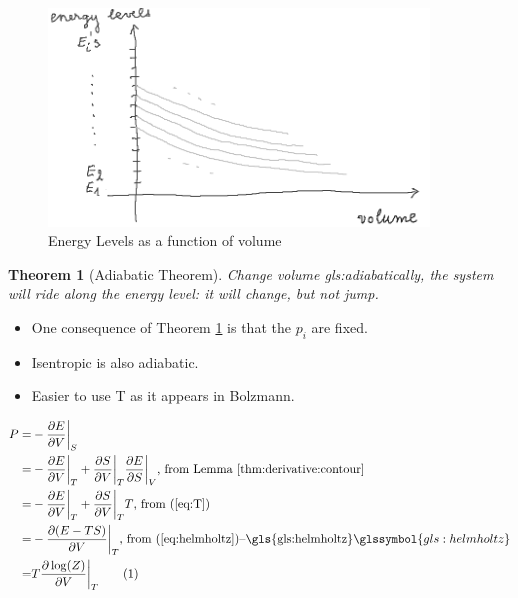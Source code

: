 \documentclass[]{article}
\newcommand\numberthis{\addtocounter{equation}{1}\tag{\theequation}}
\newtheorem{thm}{Theorem}
\begin{document}
\begin{figure}[H]
	\caption{Energy Levels as a function of volume}
	\includegraphics[width=0.9\textwidth]{energy-levels-volume}
\end{figure}




\begin{thm}[Adiabatic Theorem]\label{thm:adiabatic}
	Change volume \gls{gls:adiabatic}ally, the system will ride along the energy level: it will change, but not jump.
\end{thm}

\begin{itemize}
	\item One consequence of Theorem \ref{thm:adiabatic} is that the $p_i$ are fixed.
	
	\item Isentropic is also adiabatic.
	
	\item Easier to use T as it appears in Bolzmann.
\end{itemize}

\begin{align*}
P =& - \frac{\partial E}{\partial V}\bigg|_S \\
=& - \frac{\partial E}{\partial V}\bigg|_T + \frac{\partial S}{\partial V}\bigg|_T \frac{\partial E}{\partial S}\bigg|_V\text{, from Lemma \ref{thm:derivative:contour}}\\
=& - \frac{\partial E}{\partial V}\bigg|_T + \frac{\partial S}{\partial V}\bigg|_T T\text{, from (\ref{eq:T})}\\
=& - \frac{\partial(E-TS)}{\partial V}\bigg|_T \text{, from (\ref{eq:helmholtz})--\gls{gls:helmholtz}} \glssymbol{gls:helmholtz}\\
=& T \frac{\partial \log(Z)}{\partial V}\bigg|_T \numberthis \label{eq:P_Z_V}
\end{align*}
\end{document}
